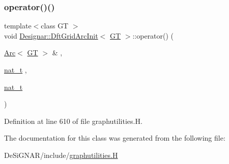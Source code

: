 \subsubsection{\texorpdfstring{operator()()}{operator()()}}
{\footnotesize\ttfamily template$<$class GT $>$ \\
void \hyperlink{class_designar_1_1_dft_grid_arc_init}{Designar\+::\+Dft\+Grid\+Arc\+Init}$<$ \hyperlink{demo-buildgraph_8_c_a3001c40d2c31ca87ed96cd7d1334a55e}{GT} $>$\+::operator() (\begin{DoxyParamCaption}\item[{\hyperlink{namespace_designar_a3f55fb5513d62ff47cbc8f72b8e95d6f}{Arc}$<$ \hyperlink{demo-buildgraph_8_c_a3001c40d2c31ca87ed96cd7d1334a55e}{GT} $>$ \&}]{,  }\item[{\hyperlink{namespace_designar_aa72662848b9f4815e7bf31a7cf3e33d1}{nat\+\_\+t}}]{,  }\item[{\hyperlink{namespace_designar_aa72662848b9f4815e7bf31a7cf3e33d1}{nat\+\_\+t}}]{ }\end{DoxyParamCaption})\hspace{0.3cm}{\ttfamily [inline]}}



Definition at line 610 of file graphutilities.\+H.



The documentation for this class was generated from the following file\+:\begin{DoxyCompactItemize}
\item 
De\+Si\+G\+N\+A\+R/include/\hyperlink{graphutilities_8_h}{graphutilities.\+H}\end{DoxyCompactItemize}
